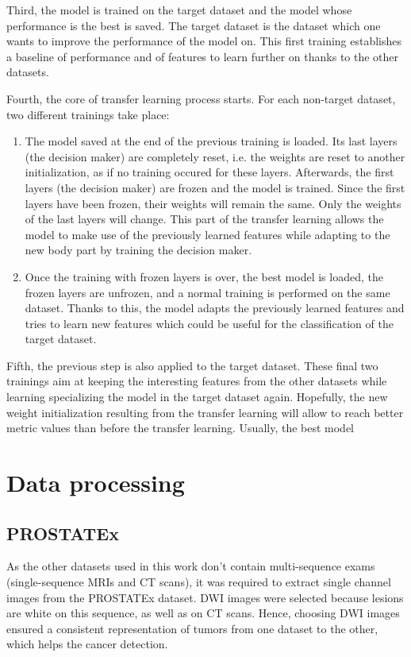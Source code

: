 Third, the model is trained on the target dataset and the model whose performance is the best is saved. The target dataset is the dataset which one wants to improve the performance of the model on. This first training establishes a baseline of performance and of features to learn further on thanks to the other datasets. 

Fourth, the core of transfer learning process starts. For each non-target dataset, two different trainings take place:

\begin{enumerate}
	\item The model saved at the end of the previous training is loaded. Its last layers (the decision maker) are completely reset, i.e. the weights are reset to another initialization, as if no training occured for these layers. Afterwards, the first layers (the decision maker) are frozen and the model is trained. Since the first layers have been frozen, their weights will remain the same. Only the weights of the last layers will change. This part of the transfer learning allows the model to make use of the previously learned features while adapting to the new body part by training the decision maker. 
	\item Once the training with frozen layers is over, the best model is loaded, the frozen layers are unfrozen, and a normal training is performed on the same dataset. Thanks to this, the model adapts the previously learned features and tries to learn new features which could be useful for the classification of the target dataset. 
\end{enumerate}

Fifth, the previous step is also applied to the target dataset. These final two trainings aim at keeping the interesting features from the other datasets while learning specializing the model in the target dataset again. Hopefully, the new weight initialization resulting from the transfer learning will allow to reach better metric values than before the transfer learning. Usually, the best model 


\section{Data processing}
\subsection{PROSTATEx}
\label{sec:PROSTATEx}
As the other datasets used in this work don't contain multi-sequence exams (single-sequence MRIs and CT scans), it was required to extract single channel images from the PROSTATEx dataset. DWI images were selected because lesions are white on this sequence, as well as on CT scans. Hence, choosing DWI images ensured a consistent representation of tumors from one dataset to the other, which helps the cancer detection.

